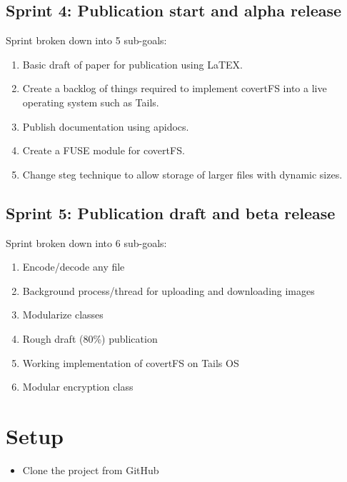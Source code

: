 \documentclass[letterpaper,12pt,openany,oneside]{sphinxmanual}
\begin{document}
\section{Sprint 4: Publication start and alpha release}
\label{index:sprint-4-publication-start-and-alpha-release}
Sprint broken down into 5 sub-goals:
\begin{enumerate}
\item {} 
Basic draft of paper for publication using LaTEX.

\item {} 
Create a backlog of things required to implement covertFS into a live operating system such as Tails.

\item {} 
Publish documentation using apidocs.

\item {} 
Create a FUSE module for covertFS.

\item {} 
Change steg technique to allow storage of larger files with dynamic sizes.

\end{enumerate}


\section{Sprint 5: Publication draft and beta release}
\label{index:sprint-5-publication-draft-and-beta-release}
Sprint broken down into 6 sub-goals:
\begin{enumerate}
\item {} 
Encode/decode any file

\item {} 
Background process/thread for uploading and downloading images

\item {} 
Modularize classes

\item {} 
Rough draft (80\%) publication

\item {} 
Working implementation of covertFS on Tails OS

\item {} 
Modular encryption class

\end{enumerate}


\chapter{Setup}
\label{index:setup}\begin{itemize}
\item {} 
Clone the project from GitHub 

\end{itemize}
\end{document}

